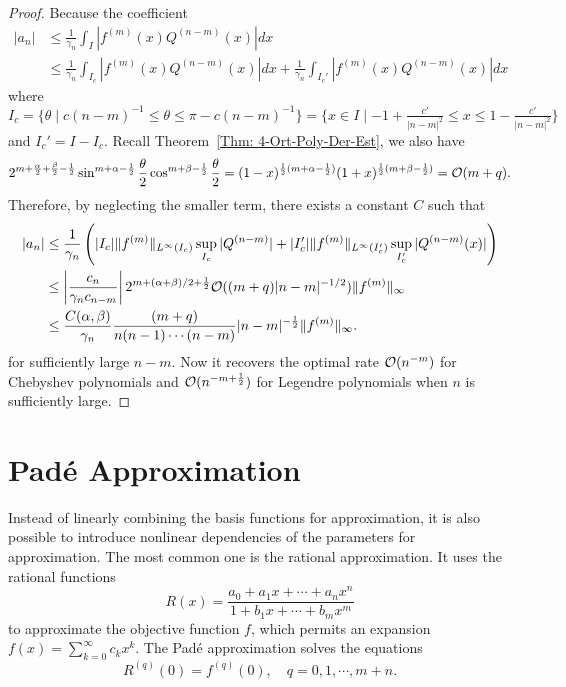 \begin{proof}
    Because the coefficient 
    \begin{equation}
    \begin{aligned}
        |a_n| &\le \frac{1}{\gamma_n} \int_{I} |f^{(m)}(x) Q^{(n-m)}(x) | dx  \\
        &\le \frac{1}{\gamma_n} \int_{I_c} |f^{(m)}(x) Q^{(n-m)}(x) | dx + \frac{1}{\gamma_n} \int_{I_c'} |f^{(m)}(x)Q^{(n-m)}(x)| dx 
    \end{aligned}
    \end{equation}
    where $I_c = \{\theta\mid c (n-m)^{-1}\le \theta\le \pi - c(n-m)^{-1} \} = \{x\in I\mid -1+\frac{c'}{|n-m|^2} \le x \le 1 - \frac{c'}{|n-m|^2}\}$ and $I_c' = I - I_c$. Recall Theorem~\ref{Thm: 4-Ort-Poly-Der-Est}, we also have
    \begin{equation}
        2^{m+\frac{\alpha}{2} + \frac{\beta}{2} - \frac{1}{2}} \sin^{m+\alpha-\frac{1}{2}}\frac{\theta}{2} \cos^{m+\beta-\frac{1}{2}}\frac{\theta}{2}  = (1-x)^{\frac{1}{2}(m+\alpha-\frac{1}{2})} (1+x)^{\frac{1}{2}(m+\beta-\frac{1}{2})} = \mathcal O(m+q).
    \end{equation}
    Therefore, by neglecting the smaller term, there exists a constant $C$ such that
    \begin{equation}
    \begin{aligned}
    |a_n| &\le \frac{1}{\gamma_n}  \left( |I_c|\|f^{(m)}\|_{L^{\infty}(I_c)} \sup_{I_c} |Q^{(n-m)}| + |I_c'|\|f^{(m)}\|_{L^{\infty}(I_c')} \sup_{I_c'} |Q^{(n-m)}(x)| \right) \\
    &\le\left| \frac{c_n}{\gamma_n c_{n-m}} \right| 2^{m+(\alpha+\beta)/2+\frac{1}{2}}\mathcal O((m+q)|n-m|^{-1/2}) \|f^{(m)}\|_{\infty} \\
    &\le \frac{C(\alpha, \beta)}{\gamma_n} \frac{(m+q)}{n(n-1)\cdots (n-m)}|n-m|^{-\frac{1}{2}} \|f^{(m)}\|_{\infty}.
    \end{aligned}
    \end{equation}
    for sufficiently large $n - m$. Now it recovers the optimal rate $\mathcal O(n^{-m})$ for Chebyshev polynomials and $\mathcal O(n^{-m+\frac{1}{2}})$ for Legendre polynomials when $n$ is sufficiently large.
\end{proof}
\section{Pad\'e Approximation}
Instead of linearly combining the basis functions for approximation, it is also possible to introduce nonlinear dependencies of the parameters for approximation. The most common one is the rational approximation. It uses the rational functions 
\begin{equation}
    R(x) = \frac{a_0 + a_1 x + \cdots + a_n x^n}{1 + b_1 x + \cdots + b_m x^m}
\end{equation}
to approximate the objective function $f$, which permits an expansion $f(x) = \sum_{k=0}^{\infty} c_k x^k$. The Pad\'e approximation solves the equations 
\begin{equation}
    R^{(q)}(0) = f^{(q)}(0),\quad q = 0, 1, \cdots, m+n.
\end{equation}

